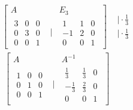 \documentclass[12pt,a4paper]{article}
\begin{document}
\[
\begin{matrix}
    \begin{bmatrix}
        A && E_3\\
        \begin{matrix}
            3 & 0 & 0 \\
            0 & 3 & 0 \\
            0 & 0 & 1
        \end{matrix} & \vert &
        \begin{matrix}
            1 & 1 & 0 \\
            -1 & 2 & 0 \\
            0 & 0 & 1
        \end{matrix}
    \end{bmatrix}
    &
    \begin{matrix}
        \vert \cdot \frac{1}{3} \\
        \vert \cdot \frac{1}{3}
    \end{matrix}
    &&
\end{matrix}
\]
\[
\begin{matrix}
    \begin{bmatrix}
        A && A^{-1}\\
        \begin{matrix}
            1 & 0 & 0 \\
            0 & 1 & 0 \\
            0 & 0 & 1
        \end{matrix} & \vert &
        \begin{matrix}
            \frac{1}{3} & \frac{1}{3} & 0 \\
            -\frac{1}{3} & \frac{2}{3} & 0 \\
            0 & 0 & 1
        \end{matrix}
    \end{bmatrix}
    &&&&&
\end{matrix}
\]
\end{document}
